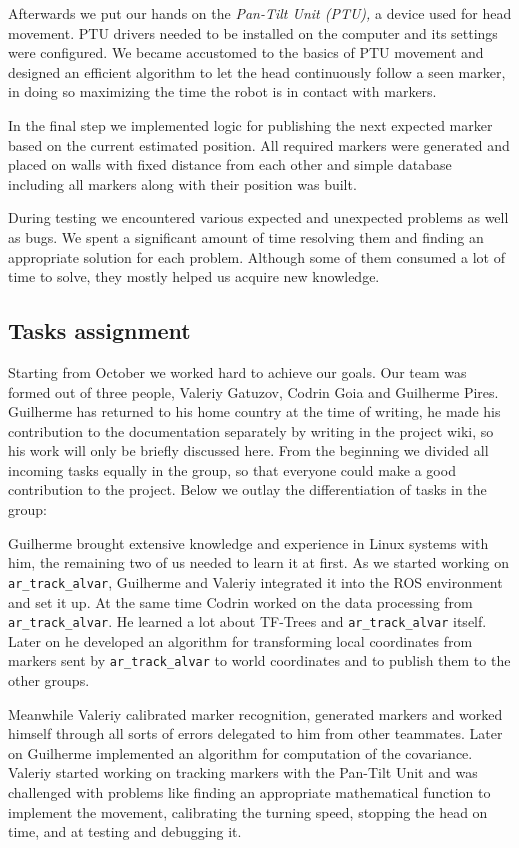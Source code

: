 Afterwards we put our hands on the \textit{Pan-Tilt Unit (PTU),} a device used for head movement. PTU drivers needed to be installed on the computer and its settings were configured. We became accustomed to the basics of PTU movement and designed an efficient algorithm to let the head continuously follow a seen marker, in doing so maximizing the time the robot is in contact with markers.

In the final step we implemented logic for publishing the next expected marker based on the current estimated position. All required markers were generated and placed on walls with fixed distance from each other and simple database including all markers along with their position was built.

During testing we encountered various expected and unexpected problems as well as bugs. We spent a significant amount of time resolving them and finding an appropriate solution for each problem. Although some of them consumed a lot of time to solve, they mostly helped us acquire new knowledge.

\subsection{Tasks assignment}

Starting from October we worked hard to achieve our goals. Our team was formed out of three people, Valeriy Gatuzov, Codrin Goia and Guilherme Pires. Guilherme has returned to his home country at the time of writing, he made his contribution to the documentation separately by writing in the project wiki, so his work will only be briefly discussed here. From the beginning we divided all incoming tasks equally in the group, so that everyone could make a good contribution to the project. Below we outlay the differentiation of tasks in the group:

Guilherme brought extensive knowledge and experience in Linux systems with him, the remaining two of us needed to learn it at first. As we started working on \texttt{ar\_track\_alvar}, Guilherme and Valeriy integrated it into the ROS environment and set it up. At the same time Codrin worked on the data processing from \texttt{ar\_track\_alvar}. He learned a lot about TF-Trees and \texttt{ar\_track\_alvar} itself. Later on he developed an algorithm for transforming local coordinates from markers sent by \texttt{ar\_track\_alvar} to world coordinates and to publish them to the other groups.

Meanwhile Valeriy calibrated marker recognition, generated markers and worked himself through all sorts of errors delegated to him from other teammates. Later on Guilherme implemented an algorithm for computation of the covariance. Valeriy started working on tracking markers with the Pan-Tilt Unit and was challenged with problems like finding an appropriate mathematical function to implement the movement, calibrating the turning speed, stopping the head on time, and at testing and debugging it.

